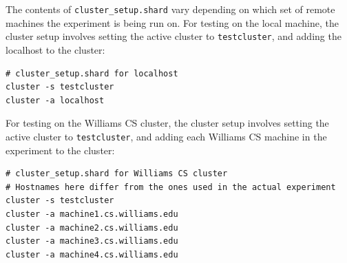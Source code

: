 \documentclass[oneside]{report}
\begin{document}
The contents of \texttt{cluster\_setup.shard} vary depending on which set of remote machines the experiment is being run on.
For testing on the local machine, the cluster setup involves setting the active cluster to \texttt{testcluster}, and adding the localhost to the cluster:

\begin{minipage}[c]{\textwidth-15pt}
  \begin{lstlisting}[language=Shard]
# cluster_setup.shard for localhost
cluster -s testcluster
cluster -a localhost
\end{lstlisting}
  \smallskip
\end{minipage}

\begin{sloppypar}
  For testing on the Williams CS cluster, the cluster setup involves setting the active cluster to \texttt{testcluster}, and adding each Williams CS machine in the experiment to the cluster:
\end{sloppypar}

\begin{minipage}[c]{\textwidth-15pt}
  \begin{lstlisting}[language=Shard]
# cluster_setup.shard for Williams CS cluster
# Hostnames here differ from the ones used in the actual experiment
cluster -s testcluster
cluster -a machine1.cs.williams.edu
cluster -a machine2.cs.williams.edu
cluster -a machine3.cs.williams.edu
cluster -a machine4.cs.williams.edu
\end{lstlisting}
  \smallskip
\end{minipage}


\end{document}
